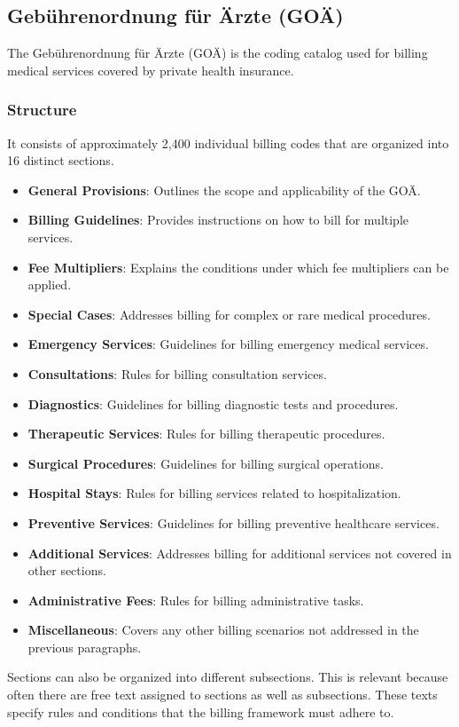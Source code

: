 \subsection{Gebührenordnung für Ärzte (GOÄ)}
The Gebührenordnung für Ärzte (GOÄ) is the coding catalog used for billing medical services covered by private health insurance.

\subsubsection{Structure}
It consists of approximately 2,400 individual billing codes that are organized into 16 distinct sections\cite[]{hermanns2011gebuhrenordnung}.

\begin{itemize}
    \item \textbf{General Provisions}: Outlines the scope and applicability of the GOÄ.
    \item \textbf{Billing Guidelines}: Provides instructions on how to bill for multiple services.
    \item \textbf{Fee Multipliers}: Explains the conditions under which fee multipliers can be applied.
    \item \textbf{Special Cases}: Addresses billing for complex or rare medical procedures.
    \item \textbf{Emergency Services}: Guidelines for billing emergency medical services.
    \item \textbf{Consultations}: Rules for billing consultation services.
    \item \textbf{Diagnostics}: Guidelines for billing diagnostic tests and procedures.
    \item \textbf{Therapeutic Services}: Rules for billing therapeutic procedures.
    \item \textbf{Surgical Procedures}: Guidelines for billing surgical operations.
    \item \textbf{Hospital Stays}: Rules for billing services related to hospitalization.
    \item \textbf{Preventive Services}: Guidelines for billing preventive healthcare services.
    \item \textbf{Additional Services}: Addresses billing for additional services not covered in other sections.
    \item \textbf{Administrative Fees}: Rules for billing administrative tasks.
    \item \textbf{Miscellaneous}: Covers any other billing scenarios not addressed in the previous paragraphs.
\end{itemize}
Sections can also be organized into different subsections.
This is relevant because often there are free text assigned to sections as well as subsections.
These texts specify rules and conditions that the billing framework must adhere to.

